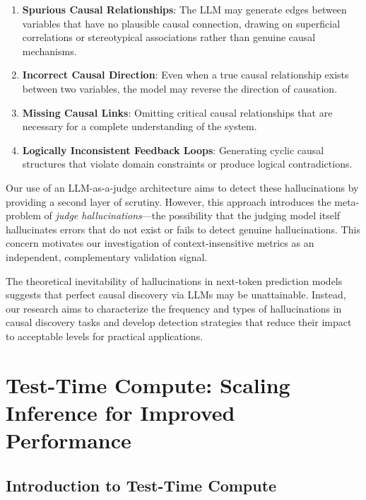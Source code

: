\begin{enumerate}
    \item \textbf{Spurious Causal Relationships}: The LLM may generate edges between variables that have no plausible causal connection, drawing on superficial correlations or stereotypical associations rather than genuine causal mechanisms.
    
    \item \textbf{Incorrect Causal Direction}: Even when a true causal relationship exists between two variables, the model may reverse the direction of causation.
    
    \item \textbf{Missing Causal Links}: Omitting critical causal relationships that are necessary for a complete understanding of the system.
    
    \item \textbf{Logically Inconsistent Feedback Loops}: Generating cyclic causal structures that violate domain constraints or produce logical contradictions.
\end{enumerate}

Our use of an LLM-as-a-judge architecture aims to detect these hallucinations by providing a second layer of scrutiny. However, this approach introduces the meta-problem of \textit{judge hallucinations}—the possibility that the judging model itself hallucinates errors that do not exist or fails to detect genuine hallucinations. This concern motivates our investigation of context-insensitive metrics as an independent, complementary validation signal.

The theoretical inevitability of hallucinations in next-token prediction models \citep{openai2025bluffing,arxiv2025comprehensive} suggests that perfect causal discovery via LLMs may be unattainable. Instead, our research aims to characterize the frequency and types of hallucinations in causal discovery tasks and develop detection strategies that reduce their impact to acceptable levels for practical applications.


\section{Test-Time Compute: Scaling Inference for Improved Performance}
\label{sec:test_time_compute}

\subsection{Introduction to Test-Time Compute}

